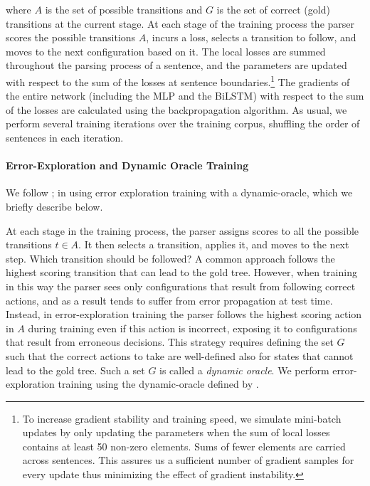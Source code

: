 \documentclass[11pt]{article}
\begin{document}
\noindent where $A$ is the set of possible transitions and $G$ is the set of
correct (gold) transitions at the current stage. 
At each stage of the training process the parser scores the possible transitions
$A$, incurs a loss, selects a transition to follow, and moves to the next
configuration based on it.
The local losses are summed throughout the parsing
process of a sentence, and the parameters are updated with respect to the sum of the losses at
sentence boundaries.\footnote{To increase gradient stability and training speed,
we simulate mini-batch updates by only updating the parameters when the sum of local losses contains
at least 50 non-zero elements.  Sums of fewer elements are carried across
sentences.  This assures us a sufficient number of gradient samples for every update thus minimizing the effect of
gradient instability.}
The gradients of the entire network (including the MLP and the BiLSTM) with respect to the sum of the losses are
calculated using the backpropagation algorithm.
As usual, we perform several training iterations over the training corpus,
shuffling the order of sentences in each iteration.

\paragraph{Error-Exploration and Dynamic Oracle Training}
We follow ; in
using error exploration training with a dynamic-oracle, which we briefly
describe below.

At each stage in the training process, the parser assigns scores to all the
possible transitions $t \in A$. It then selects a transition, applies it, and moves to the
next step. 
Which transition should be followed?  A common approach follows the highest
scoring transition that can lead to the gold tree. However, when training in
this way the parser sees only configurations that result from following correct
actions, and as a result tends to suffer from error propagation at test time.
Instead, in error-exploration training the parser follows the highest scoring
action in $A$ during training even if this action is incorrect, exposing it to
configurations that result from erroneous decisions.
This strategy requires defining the set $G$ such that the correct actions to
take are well-defined also for states that cannot lead to the gold tree.
Such a set $G$ is called a \emph{dynamic oracle}. We perform error-exploration
training using the dynamic-oracle defined by .
\end{document}

